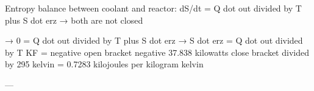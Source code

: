 Entropy balance between coolant and reactor:  
dS/dt = Q dot out divided by T plus S dot erz  
→ both are not closed  

→ 0 = Q dot out divided by T plus S dot erz  
→ S dot erz = Q dot out divided by T KF = negative open bracket negative 37.838 kilowatts close bracket divided by 295 kelvin = 0.7283 kilojoules per kilogram kelvin  

---